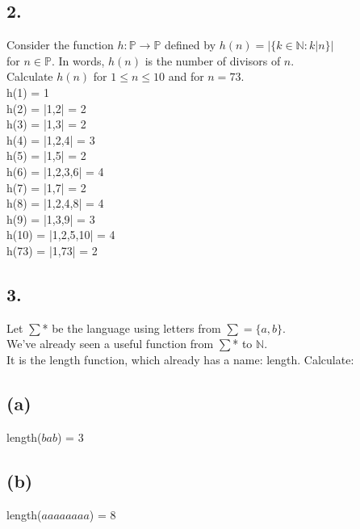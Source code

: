 \documentclass[11pt]{article}
\begin{document}
\subsection*{2.}
\begin{center}
Consider the function $h: \mathbb{P} \rightarrow  \mathbb{P}$ defined by $h(n) = |\{k \in \mathbb{N} : k|n\}|$\\
for $n \in \mathbb{P}$. In words, $h(n)$ is the number of divisors of $n$.\\
Calculate $h(n)$ for $1 \leq n \leq 10$ and for $n = 73$.\\
\hfill \break
h(1) =	1\\
h(2) =	|1,2| = 2\\
h(3) =	|1,3| = 2\\
h(4) =	|1,2,4| = 3\\
h(5) =	|1,5| = 2\\
h(6) =	|1,2,3,6| = 4\\
h(7) =	|1,7| = 2\\
h(8) =	|1,2,4,8| = 4\\
h(9) =	|1,3,9| = 3\\
h(10) =	|1,2,5,10| = 4\\
h(73) =	|1,73| = 2\\
\end{center}
%
%
\hfill \break
\hfill \break
\hfill \break
\hfill \break
\hfill \break
\subsection*{3.}
\begin{center}
Let $\sum$* be the language using letters from $\sum = \{a,b\}$.\\
We've already seen a useful function from $\sum$* to $\mathbb{N}$.\\
It is the length function, which already has a name: length. Calculate:\\
\end{center}

\subsection*{(a)}
\begin{center}
length($bab$) = 3
\end{center}

\subsection*{(b)}
\begin{center}
length($aaaaaaaa$) = 8
\end{center}
\end{document}
